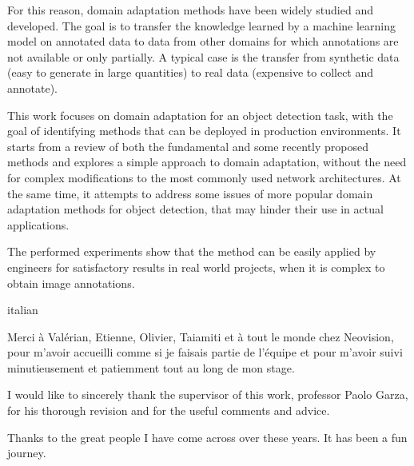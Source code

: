 \documentclass[%
    corpo=12pt,
    twoside,
    stile=classica,   
    tipotesi=magistrale,
    evenboxes,
    english,
	numerazioneromana,
]{toptesi}
\begin{document}
For this reason, domain adaptation methods have been widely studied and developed. The goal is to transfer the knowledge learned by a machine learning model on annotated data to data from other domains for which annotations are not available or only partially. A typical case is the transfer from synthetic data (easy to generate in large quantities) to real data (expensive to collect and annotate).

\bigskip
This work focuses on domain adaptation for an object detection task, with the goal of identifying methods that can be deployed in production environments. It starts from a review of both the fundamental and some recently proposed methods and explores a simple approach to domain adaptation, without the need for complex modifications to the most commonly used network architectures. At the same time, it attempts to address some issues of more popular domain adaptation methods for object detection, that may hinder their use in actual applications.

The performed experiments show that the method can be easily applied by engineers for satisfactory results in real world projects, when it is complex to obtain image annotations.

\paginavuota %

\ringraziamenti
\begin{otherlanguage*}{italian}
\end{otherlanguage*}

\vspace*{1cm}

\bigskip
\foreignlanguage{french}{Merci à Valérian, Etienne, Olivier, Taiamiti et à tout le monde chez Neovision, pour m'avoir accueilli comme si je faisais partie de l'équipe et pour m'avoir suivi minutieusement et patiemment tout au long de mon stage.}

\bigskip
I would like to sincerely thank the supervisor of this work, professor Paolo Garza, for his thorough revision and for the useful comments and advice.

\bigskip
Thanks to the great people I have come across over these years. It has been a fun journey.

\paginavuota
\end{document}
